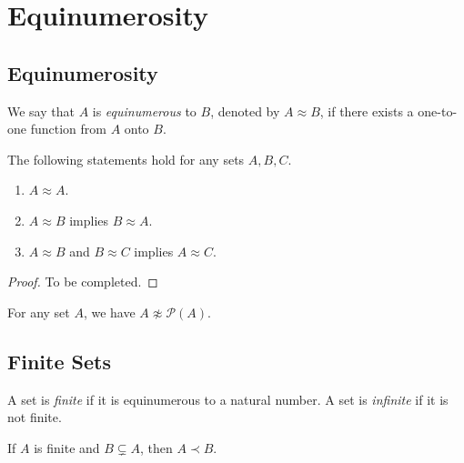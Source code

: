 \chapter{Equinumerosity}
\section{Equinumerosity}
\begin{definition}
  We say that $A$ is \emph{equinumerous} to $B$, denoted by $A \approx B$,
  if there exists a one-to-one function from $A$ onto $B$.
\end{definition}

\begin{theorem}
  The following statements hold for any sets $A, B, C$.
  \begin{enumerate}
    \item $A \approx A$.
    \item $A \approx B$ implies $B \approx A$.
    \item $A \approx B$ and $B \approx C$ implies $A \approx C$.
  \end{enumerate}
\end{theorem}
\begin{proof}
  To be completed.
\end{proof}

\begin{theorem}
  For any set $A$, we have $A \not \approx \mathcal{P}(A)$.
\end{theorem}

\section{Finite Sets}
\begin{definition}
  A set is \emph{finite} if it is equinumerous to a natural number.
  A set is \emph{infinite} if it is not finite.
\end{definition}

\begin{theorem}
  If $A$ is finite and $B \subsetneq A$, then $A \prec B$.
\end{theorem}
